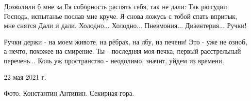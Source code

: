 Дозволили б мне за Ея соборность распять себя, так не дали:
Так рассудил Господь, испытанье послав мне круче.
Я снова ложусь с тобой спать впритык, мне снятся Дали и дали.
Холодно... Холодно... Пневмония... Дизентерия...   Ручки!

Ручки держи - на моем животе, на рёбрах, на лбу, на печени!
Это - уже не озноб, а нечто, похожее на смирение.
Ты - последняя моя печка, первый расстрельный перечень...
Коль уж пространство - неодолимо, значит, уйдем из времени.

22 мая 2021 г.

Фото: Константин Антипин. Секирная гора.

